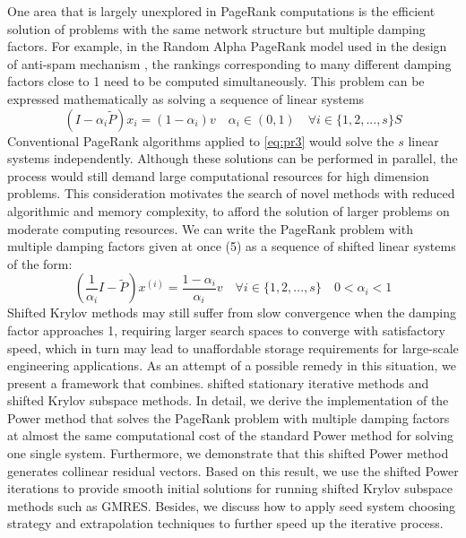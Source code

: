 \documentclass[12pt]{article}
\begin{document}
One area that is largely unexplored in PageRank computations is the efficient solution of problems with the same network structure but multiple damping factors. For example, in the Random Alpha PageRank model used in the design of anti-spam mechanism \cite{Constantine2009Random}, the rankings corresponding to many different damping factors close to 1 need to be computed simultaneously. This problem can be expressed mathematically as solving a sequence of linear systems
\begin{equation}\label{eq:pr3}
    (I - \alpha_i \tilde P)x_i = (1 - \alpha_i)v \quad  \alpha_i \in (0, 1) \quad \forall i \in \{1, 2, ..., s\} S
\end{equation}
Conventional PageRank algorithms applied to \ref{eq:pr3} would solve the $s$ linear systems independently. Although these solutions can be performed in parallel, the process would still demand large computational resources for high dimension problems.
This consideration motivates the search of novel methods with reduced algorithmic and memory complexity, to afford the solution of larger problems on moderate computing resources. We can write the PageRank problem with multiple damping factors given at once (5) as a sequence of shifted linear systems of the form:
\begin{equation}
    (\frac{1}{\alpha_i}I - \tilde P)x^{(i)} = \frac{1 - \alpha_i}{\alpha_i}v \quad \forall i \in \{1, 2, ..., s\} \quad 0 < \alpha_i < 1
\end{equation}
Shifted Krylov methods may still suffer from slow convergence when the damping factor approaches 1, requiring larger search spaces to converge with satisfactory speed, which in turn may lead to unaffordable storage requirements for large-scale engineering applications. As an attempt of a possible remedy in this situation, we present a framework that combines. shifted stationary iterative methods and shifted Krylov subspace methods. In detail, we derive the implementation of the
Power method that solves the PageRank problem with multiple damping factors at almost the same computational cost of the standard Power method for solving one single system. Furthermore, we demonstrate that this shifted Power method generates collinear residual vectors. Based on this result, we use the shifted Power iterations to provide smooth initial solutions for running shifted Krylov subspace methods such as GMRES. Besides, we discuss how to apply seed system choosing strategy and extrapolation techniques to further speed up the iterative process.
\end{document}
